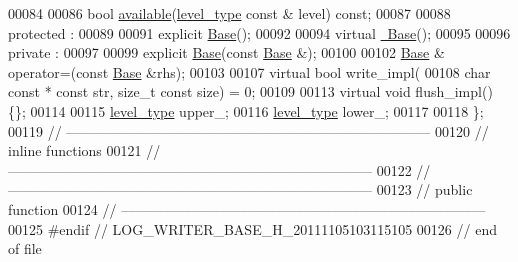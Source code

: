 \begin{DoxyCode}
00084 
00086     \textcolor{keywordtype}{bool} \hyperlink{classhryky_1_1log_1_1writer_1_1_base_a8ce37ac3efe4c77e4020bdbaebda85b3}{available}(\hyperlink{classhryky_1_1log_1_1level_1_1_entity}{level_type} \textcolor{keyword}{const} & level) \textcolor{keyword}{const};
00087 
00088 \textcolor{keyword}{protected} :
00089 
00091     \textcolor{keyword}{explicit} \hyperlink{classhryky_1_1log_1_1writer_1_1_base_a5ffe0568374d8b9b4c4ec32953fd6453}{Base}();
00092 
00094     \textcolor{keyword}{virtual} \hyperlink{classhryky_1_1log_1_1writer_1_1_base_a722da881b6c70cfcbde9243abcfbf334}{~Base}();
00095 
00096 \textcolor{keyword}{private} :
00097 
00099     \textcolor{keyword}{explicit} \hyperlink{classhryky_1_1log_1_1writer_1_1_base_a5ffe0568374d8b9b4c4ec32953fd6453}{Base}(\textcolor{keyword}{const} \hyperlink{classhryky_1_1log_1_1writer_1_1_base}{Base} &);
00100 
00102     \hyperlink{classhryky_1_1log_1_1writer_1_1_base}{Base} & operator=(\textcolor{keyword}{const} \hyperlink{classhryky_1_1log_1_1writer_1_1_base}{Base} &rhs);
00103 
00107     \textcolor{keyword}{virtual} \textcolor{keywordtype}{bool} write\_impl(
00108         \textcolor{keywordtype}{char} \textcolor{keyword}{const} * \textcolor{keyword}{const} str, \textcolor{keywordtype}{size\_t} \textcolor{keyword}{const} size) = 0;
00109 
00113     \textcolor{keyword}{virtual} \textcolor{keywordtype}{void} flush\_impl() \{\};
00114 
00115     \hyperlink{classhryky_1_1log_1_1level_1_1_entity}{level_type}  upper\_;
00116     \hyperlink{classhryky_1_1log_1_1level_1_1_entity}{level_type}  lower\_;
00117 
00118 \};
00119 \textcolor{comment}{//
      ------------------------------------------------------------------------------}
00120 \textcolor{comment}{// inline functions}
00121 \textcolor{comment}{//
      ------------------------------------------------------------------------------}
00122 \textcolor{comment}{//
      ------------------------------------------------------------------------------}
00123 \textcolor{comment}{// public function}
00124 \textcolor{comment}{//
      ------------------------------------------------------------------------------}
00125 \textcolor{preprocessor}{#endif // LOG\_WRITER\_BASE\_H\_20111105103115105}
00126 \textcolor{preprocessor}{}\textcolor{comment}{// end of file}
\end{DoxyCode}
